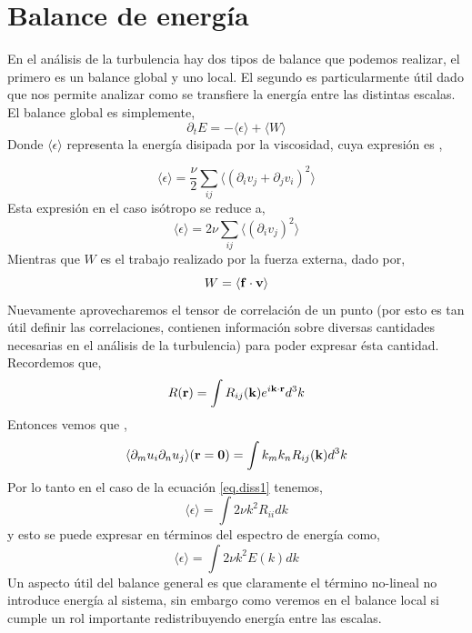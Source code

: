 \documentclass[executivepaper,12pt]{article}
\numberwithin{equation}{section}
\begin{document}
\pagebreak

\section{Balance de energía}

En el análisis de la turbulencia hay dos tipos de balance que podemos realizar, el primero es un balance global y uno local. El segundo es particularmente útil dado que nos permite analizar como se transfiere la energía entre las distintas escalas. El balance global es simplemente,
\begin{equation*}
	\partial_t E=-\langle \epsilon\rangle+\langle W \rangle
\end{equation*}
Donde $\langle \epsilon\rangle$ representa la energía disipada por la viscosidad, cuya expresión es \parencite{mccomb2014},

\begin{equation*}
	\langle \epsilon\rangle=\frac{\nu}{2}\sum_{ij} \langle \left(\partial_i v_j +\partial_j v_i\right)^2 \rangle 
\end{equation*}
Esta expresión en el caso isótropo se reduce a,
\begin{equation}
	\langle \epsilon\rangle=2\nu\sum_{ij} \langle \left(\partial_i v_j\right)^2 \rangle \label{eq.diss1}
\end{equation} 
Mientras que $W$ es el trabajo realizado por la fuerza externa, dado por,
\begin{equation*}
	W=\langle\vb{f}\cdot \vb{v}\rangle
\end{equation*} 
Nuevamente aprovecharemos el tensor de correlación de un punto (por esto es tan útil definir las correlaciones, contienen información sobre diversas cantidades necesarias en el análisis de la turbulencia) para poder expresar ésta cantidad. Recordemos que,
\begin{equation*}
	R(\vb{r})=\int R_{ij}(\vb{k}) e^{i\vb{k}\cdot\vb{r}}d^3k 
\end{equation*}  
 Entonces vemos que \parencite{pope2001}, 
 \begin{equation*}
 	\langle \partial_m u_i \partial_n u_j\rangle(\vb{r}=\vb{0})=\int k_m k_n R_{ij}(\vb{k}) d^3 k
 \end{equation*}
 Por lo tanto en el caso de la ecuación \ref{eq.diss1} tenemos,
 \begin{equation*}
 	\langle\epsilon\rangle=\int 2\nu k^2R_{ii} dk
 \end{equation*}
 y esto se puede expresar en términos del espectro de energía como,
\begin{equation*}
	\langle\epsilon\rangle=\int 2\nu k^2E(k)dk
\end{equation*}
Un aspecto útil del balance general es que claramente el término no-lineal no introduce energía al sistema, sin embargo como veremos en el balance local si cumple un rol importante redistribuyendo energía entre las escalas.
\end{document}
